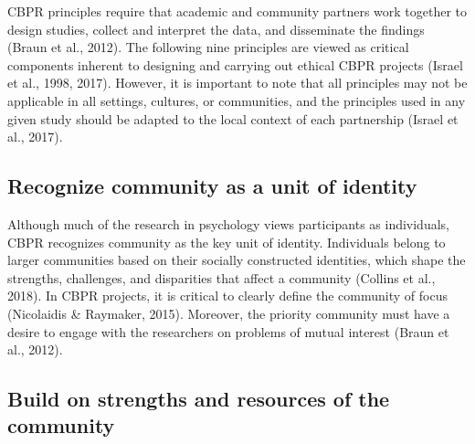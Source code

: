 \documentclass[
  11pt,
]{book}
\begin{document}
CBPR principles require that academic and community partners work together to design studies, collect and interpret the data, and disseminate the findings (Braun et al., 2012). The following nine principles are viewed as critical components inherent to designing and carrying out ethical CBPR projects (Israel et al., 1998, 2017). However, it is important to note that all principles may not be applicable in all settings, cultures, or communities, and the principles used in any given study should be adapted to the local context of each partnership (Israel et al., 2017).

\subsection{Recognize community as a unit of identity}\label{recognize-community-as-a-unit-of-identity}

Although much of the research in psychology views participants as individuals, CBPR recognizes community as the key unit of identity. Individuals belong to larger communities based on their socially constructed identities, which shape the strengths, challenges, and disparities that affect a community (Collins et al., 2018). In CBPR projects, it is critical to clearly define the community of focus (Nicolaidis \& Raymaker, 2015). Moreover, the priority community must have a desire to engage with the researchers on problems of mutual interest (Braun et al., 2012).

\subsection{Build on strengths and resources of the community}\label{build-on-strengths-and-resources-of-the-community}
\end{document}
